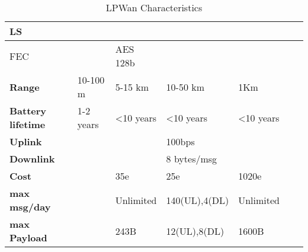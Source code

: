 \begin{table}[!ht]
\begin{tabulary}{\textwidth}{L|L|L|L|L|L|L}
	\ac{LS}                            &                & \ok                             & \ko           &             & \ko             & \ko             \\\hline
	\ac{FEC}                           &                & AES 128b                        & \ko           &             & \ok             & \ok             \\\hline
	\bf{Range}                         & 10-100 m       & 5-15 km                         & 10-50 km      & 1Km         &                 &                 \\\hline
	\bf{Battery lifetime}              & 1-2 years      & <10 years                       & <10 years     & <10 years   &                 &                 \\\hline
	\bf{Uplink}                        &                &                                 & 100bps        &             &                 &                 \\\hline
	\bf{Downlink}                      &                &                                 & 8 bytes/msg   &             &                 &                 \\\hline
	\bf{Cost}                          &                & 35e                             & 25e           & 1020e       &                 &                 \\\hline
	\bf{max msg/day}                   &                & Unlimited                       & 140(UL),4(DL) & Unlimited   &                 &                 \\\hline
	\bf{max Payload}                   &                & 243B                            & 12(UL),8(DL)  & 1600B       &                 &                 \\\hline

	\end{tabulary}
	\caption{\label{tab:LPWan_characteristics} LPWan Characteristics \cite{al-kashoash_comparison_2016}}
\end{table}

